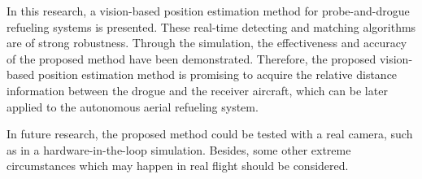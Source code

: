 In this research, a vision-based position estimation method for
probe-and-drogue refueling systems is presented. These real-time detecting
and matching algorithms are of strong robustness. Through the simulation, the effectiveness and accuracy
of the proposed method have been demonstrated. Therefore, the proposed vision-based
position estimation method is promising to acquire the relative distance
information between the drogue and the receiver aircraft, which can be later
applied to the autonomous aerial refueling system.

In future research, the proposed method could be tested with a real camera, such as in a hardware-in-the-loop simulation. Besides, some other extreme
circumstances which may happen in real flight should be considered.
